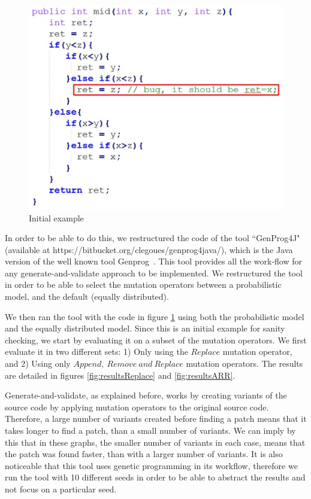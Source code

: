 \documentclass[conference]{IEEEtran}
\begin{document}
\begin{figure}[!h]
  \centering
    \includegraphics[scale=0.35]{sanity2}
  \caption{Initial example}
  \label{fig:initialExample}
\end{figure}

In order to be able to do this, we restructured the code of the tool ``GenProg4J" (available at 
https://bitbucket.org/clegoues/genprog4java/), which is the Java version of the 
well known tool Genprog~\cite{legoues12}. This tool provides all the work-flow 
for any generate-and-validate approach to be implemented. We restructured the 
tool in order to be able to select the mutation operators between a 
probabilistic model, and the default (equally distributed).

We then ran the tool with the code in figure \ref{fig:initialExample} using both 
the probabilistic model and the equally distributed model. Since this is an 
initial example for sanity checking, we start by evaluating it on a subset of 
the mutation operators. We first evaluate it in two different sets: 1) Only using the $Replace$ mutation operator, and 2) Using only $Append,~
Remove~and~Replace$ mutation operators. The results are detailed in figures 
\ref{fig:resultsReplace} and \ref{fig:resultsARR}. 

Generate-and-validate, as explained before, works by creating variants of the 
source code by applying mutation operators to the original source code. 
Therefore, a large number of variants created before finding a patch means that 
it takes longer to find a patch, than a small number of variants. We can imply by this 
that in these graphs, the smaller number of variants in each case, means that 
the patch was found faster, than with a larger number of variants. It is also 
noticeable that this tool uses genetic programming in its workflow, therefore we 
run the tool with 10 different seeds in order to be able to abstract the results 
and not focus on a particular seed.
\end{document}
